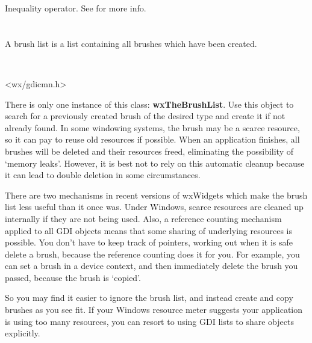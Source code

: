 
Inequality operator.
See  for more info.


\section{}\label{wxbrushlist}

A brush list is a list containing all brushes which have been created.


\\


<wx/gdicmn.h>




There is only one instance of this class: {\bf wxTheBrushList}.  Use
this object to search for a previously created brush of the desired
type and create it if not already found. In some windowing systems,
the brush may be a scarce resource, so it can pay to reuse old
resources if possible. When an application finishes, all brushes will
be deleted and their resources freed, eliminating the possibility of
`memory leaks'. However, it is best not to rely on this automatic
cleanup because it can lead to double deletion in some circumstances.

There are two mechanisms in recent versions of wxWidgets which make the
brush list less useful than it once was. Under Windows, scarce resources
are cleaned up internally if they are not being used. Also, a reference
counting mechanism applied to all GDI objects means that some sharing
of underlying resources is possible. You don't have to keep track of pointers,
working out when it is safe delete a brush, because the reference counting does
it for you. For example, you can set a brush in a device context, and then
immediately delete the brush you passed, because the brush is `copied'.

So you may find it easier to ignore the brush list, and instead create
and copy brushes as you see fit. If your Windows resource meter suggests
your application is using too many resources, you can resort to using
GDI lists to share objects explicitly.

